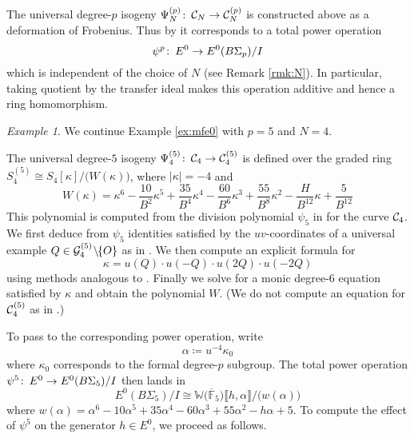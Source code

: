 \documentclass{gtpart}
\theoremstyle{definition}
\theoremstyle{remark}
\newtheorem{ex}[thm]{Example}
\def\co{\colon\thinspace}
\newcommand{\mb}[1]{\mathbb{#1}}
\newcommand{\cF}{\overline {\mb F}}
\newcommand{\CC}{{\cal C}}
\newcommand{\CG}{{\cal G}}
\newcommand{\BW}{{\mb W}}
\newcommand{\A}{\alpha}
\newcommand{\K}{\kappa}
\newcommand{\ce}{\coloneqq}
\newcommand{\lb}{\llbracket}
\newcommand{\rb}{\rrbracket}
\renewcommand{\=}{\approx}
\renewcommand{\-}{\sim}
\numberwithin{equation}{section}
\numberwithin{thm}{section}
\begin{document}
The universal degree-$p$ isogeny $\Psi_N^{(p)} \co \CC_N \to \CC_N^{(p)}$ 
is constructed above as a deformation of Frobenius.  
Thus by \cite[Theorem B]{cong} it corresponds to a total power operation 
\begin{equation}
 \label{psi}
 \psi^p \co E^0 \to E^0(B\Sigma_p) / I 
\end{equation}
which is independent of the choice of $N$ (see Remark \ref{rmk:N}).  
In particular, taking quotient by the transfer ideal makes this operation additive and hence a ring homomorphism.  
\begin{ex}
 \label{ex:po}
 We continue Example \ref{ex:mfe0} with $p = 5$ and $N = 4$.  

 The universal degree-$5$ isogeny $\Psi_4^{(5)} \co \CC_4 \to \CC_4^{(5)}$ is defined over the graded ring $S_4^{(5)} \cong S_4[\K] / \big(W(\K)\big)$, 
 where $|\K| = -4$ and 
 \begin{equation}
  \label{W}
  W(\K) = \K^6 - \frac{10}{B^2} \K^5 + \frac{35}{B^4} \K^4 - \frac{60}{B^6} \K^3 + \frac{55}{B^8} \K^2 - \frac{H}{B^{12}} \K + \frac{5}{B^{12}} 
 \end{equation}
 This polynomial is computed from the division polynomial $\psi_5$ in \cite[Exercise 3.7]{AEC} for the curve $\CC_4$.  
 We first deduce from $\psi_5$ identities satisfied by the $uv$-coordinates of a universal example 
 $Q \in \CG_4^{(5)} \!\setminus\!\! \{O\}$ as in \cite[proof of Proposition 2.2]{p3}.  
 We then compute an explicit formula for 
 \[
  \K = u(Q) \cdot u(-Q) \cdot u(2 Q) \cdot u(-2 Q) 
 \]
 using methods analogous to \cite[III.2.3]{AEC}.  
 Finally we solve for a monic degree-6 equation satisfied by $\K$ and obtain the polynomial $W$.  
 (We do not compute an equation for $\CC_4^{(5)}$ as in \cite[Proposition 2.3]{p3}.)  

 To pass to the corresponding power operation, write 
 \[
  \A \ce u^{-4} \K_0 
 \]
 where $\K_0$ corresponds to the formal degree-$p$ subgroup.  
 The total power operation $\psi^5 \co E^0 \to E^0(B\Sigma_5) / I$ then lands in 
 \[
  E^0(B\Sigma_5) / I \cong \BW \big( \cF_5 \big) \lb h, \A \rb / \big(w(\A)\big) 
 \]
 where $w(\A) = \A^6 - 10 \A^5 + 35 \A^4 - 60 \A^3 + 55 \A^2 - h \A + 5$.  
 To compute the effect of $\psi^5$ on the generator $h \in E^0$, we proceed as follows.  


\end{ex}
\end{document}
